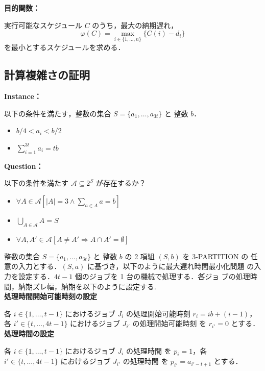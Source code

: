 \documentclass[12pt]{optlab-bachelor}
\begin{document}
  \noindent \textbf{目的関数：}

  実行可能なスケジュール $C$ のうち，最大の納期遅れ，
  $$\displaystyle \varphi(C) = \max_{i \in \{1,\ldots,n\}}\{C(i) - d_i\}$$
  を最小とするスケジュールを求める．\\

  \subsection{計算複雑さの証明}
  \noindent \textbf{Instance：}

  以下の条件を満たす，整数の集合 $S = \{a_1,\ldots,a_{3t}\}$ と 整数 $b$．
  \begin{itemize}
    \item $b/4 < a_i < b/2$
    \item $\displaystyle \sum_{i = 1}^{3t}a_i = tb$
  \end{itemize}

  \noindent \textbf{Question：}

  以下の条件を満たす $\mathcal{A} \subseteq 2^S$ が存在するか？
  \begin{itemize}
    \item $\forall A \in \mathcal{A}[|A| = 3 \land \sum_{a \in A} a = b]$
    \item $\bigcup_{A \in \mathcal{A}} A = S$
    \item $\forall A, A' \in \mathcal{A}[A \neq A' \Rightarrow A \cap A' = \emptyset]$
  \end{itemize}

  整数の集合 $S = \{a_1,\ldots,a_{3t}\}$ と 整数 $b$ の 2 項組 $(S,b)$ を 3-PARTITION の
  任意の入力とする．$(S,a)$ に基づき，以下のように最大遅れ時間最小化問題
  の入力を設定する．$4t - 1$ 個のジョブを 1 台の機械で処理する．各゙ジョ
  ブの処理時間，納期ズレ幅，納期を以下のように設定する.\\

  \noindent \textbf{処理時間開始可能時刻の設定}

  各 $i \in \{1,\ldots,t - 1\}$ におけるジョブ $J_i$ の処理開始可能時刻
  $r_i = ib + (i - 1)$，各 $i' \in \{t,\ldots,4t - 1\}$ におけるジョブ $J_{i'}$ の処理開始可能時刻
  を $r_{i'} = 0$ とする．\\

  \noindent \textbf{処理時間の設定}

  各 $i \in \{1,\ldots,t - 1\}$ におけるジョブ $J_i$ の処理時間
  を $p_i = 1$，各 $i' \in \{t,\ldots,4t - 1\}$ におけるジョブ $J_{i'}$ の処理時間
  を $p_{i'} = a_{i' - t + 1}$ とする．\\
\end{document}

